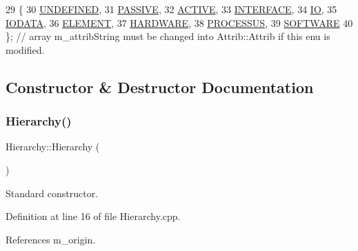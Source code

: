 \begin{DoxyCode}
29                 \{
30     \hyperlink{classAttrib_a69e171d7cc6417835a5a306d3c764235a3a8da2ab97dda18aebab196fe4100531}{UNDEFINED},
31     \hyperlink{classAttrib_a69e171d7cc6417835a5a306d3c764235a2bfb2af57b87031d190a05fe25dd92ed}{PASSIVE},
32     \hyperlink{classAttrib_a69e171d7cc6417835a5a306d3c764235a3b1fec929c0370d1436f2f06e298fb0d}{ACTIVE},
33     \hyperlink{classAttrib_a69e171d7cc6417835a5a306d3c764235aa27c16b480a369ea4d18b07b2516bbc7}{INTERFACE},
34     \hyperlink{classAttrib_a69e171d7cc6417835a5a306d3c764235a1420a5b8c0540b2af210b6975eded7f9}{IO},
35     \hyperlink{classAttrib_a69e171d7cc6417835a5a306d3c764235a0af3b0d0ac323c1704e6c69cf90add28}{IODATA},
36     \hyperlink{classAttrib_a69e171d7cc6417835a5a306d3c764235a7788bc5dd333fd8ce18562b269c9dab1}{ELEMENT},
37     \hyperlink{classAttrib_a69e171d7cc6417835a5a306d3c764235a61ceb22149f365f1780d18f9d1459423}{HARDWARE},
38     \hyperlink{classAttrib_a69e171d7cc6417835a5a306d3c764235a75250e29692496e73effca2c0330977f}{PROCESSUS},
39     \hyperlink{classAttrib_a69e171d7cc6417835a5a306d3c764235a103a67cd0b8f07ef478fa45d4356e27b}{SOFTWARE} 
40   \}; \textcolor{comment}{// array m\_attribString must be changed into Attrib::Attrib if this enu is modified. }
\end{DoxyCode}


\subsection{Constructor \& Destructor Documentation}
\mbox{\label{classHierarchy_a8288ae6edc7482d6a9f83f94c0ca93db}} 
\subsubsection{\texorpdfstring{Hierarchy()}{Hierarchy()}}
{\footnotesize\ttfamily Hierarchy\+::\+Hierarchy (\begin{DoxyParamCaption}{ }\end{DoxyParamCaption})}



Standard constructor. 



Definition at line 16 of file Hierarchy.\+cpp.



References m\+\_\+origin.


